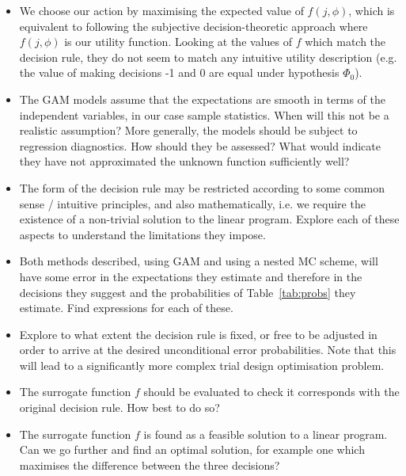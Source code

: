 \documentclass{article} %
\begin{document}
\begin{itemize}
\item We choose our action by maximising the expected value of $f(j, \phi)$, which is equivalent to following the subjective decision-theoretic approach where $f(j, \phi)$ is our utility function. Looking at the values of $f$ which match the decision rule, they do not seem to match any intuitive utility description (e.g. the value of making decisions -1 and 0 are equal under hypothesis $\Phi_{0}$). 
\item The GAM models assume that the expectations are smooth in terms of the independent variables, in our case sample statistics. When will this not be a realistic assumption? More generally, the models should be subject to regression diagnostics. How should they be assessed? What would indicate they have not approximated the unknown function sufficiently well?
\item The form of the decision rule may be restricted according to some common sense / intuitive principles, and also mathematically, i.e. we require the existence of a non-trivial solution to the linear program. Explore each of these aspects to understand the limitations they impose.
\item Both methods described, using GAM and using a nested MC scheme, will have some error in the expectations they estimate and therefore in the decisions they suggest and the probabilities of Table~\ref{tab:probs} they estimate. Find expressions for each of these.
\item Explore to what extent the decision rule is fixed, or free to be adjusted in order to arrive at the desired unconditional error probabilities. Note that this will lead to a significantly more complex trial design optimisation problem.
\item The surrogate function $f$ should be evaluated to check it corresponds with the original decision rule. How best to do so?
\item The surrogate function $f$ is found as a feasible solution to a linear program. Can we go further and find an optimal solution, for example one which maximises the difference between the three decisions?
\end{itemize}



\end{document}
